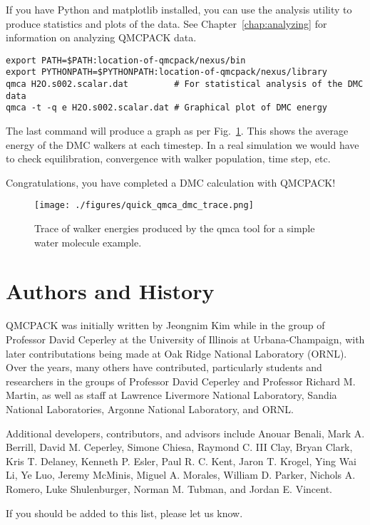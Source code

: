 If you have Python and matplotlib installed, you can use the
 analysis utility to produce statistics and plots of the
data. See Chapter~\ref{chap:analyzing} for information on analyzing
QMCPACK data.
\begin{verbatim}
export PATH=$PATH:location-of-qmcpack/nexus/bin 
export PYTHONPATH=$PYTHONPATH:location-of-qmcpack/nexus/library
qmca H2O.s002.scalar.dat         # For statistical analysis of the DMC data
qmca -t -q e H2O.s002.scalar.dat # Graphical plot of DMC energy
\end{verbatim}

The last command will produce a graph as per
Fig.~\ref{fig:quick_qmca_dmc_trace}. This shows the average energy of
the DMC walkers at each timestep. In a real simulation we would have
to check equilibration, convergence with walker population, time step, etc.

Congratulations, you have completed a DMC calculation with QMCPACK!

\begin{figure}
  \centering
  \texttt{[image: ./figures/quick\_qmca\_dmc\_trace.png]}
  \caption{Trace of walker energies produced by the qmca tool for a simple
    water molecule example.}
  \label{fig:quick_qmca_dmc_trace}
\end{figure}

\section{Authors and History}
\label{sec:history}
QMCPACK was initially written by Jeongnim Kim while in the group of
Professor David Ceperley at the University of Illinois at
Urbana-Champaign, with later contributations being made at Oak Ridge National Laboratory (ORNL). Over the years, many others have contributed, particularly
students and researchers in the groups of Professor David Ceperley
and Professor Richard M. Martin, as well as staff at Lawrence Livermore
National Laboratory, Sandia National Laboratories, Argonne National
Laboratory, and ORNL.

Additional developers, contributors, and advisors include
Anouar Benali,
Mark A. Berrill,  
David M. Ceperley, 
Simone Chiesa,
Raymond C. III Clay,
Bryan Clark,
Kris T. Delaney,
Kenneth P. Esler,
Paul R. C. Kent,
Jaron T. Krogel,
Ying Wai Li,
Ye Luo,
Jeremy McMinis,
Miguel A. Morales,
William D. Parker,
Nichols A. Romero,
Luke Shulenburger,
Norman M. Tubman,
and Jordan E. Vincent.

If you should be added to this list, please let us know.

